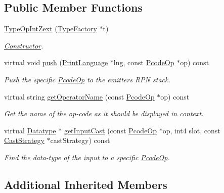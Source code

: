 \subsection*{Public Member Functions}
\begin{DoxyCompactItemize}
\item 
\mbox{\hyperlink{class_type_op_int_zext_aa97bd1e66c8746724b05c68a4ac2d7b2}{Type\+Op\+Int\+Zext}} (\mbox{\hyperlink{class_type_factory}{Type\+Factory}} $\ast$t)
\begin{DoxyCompactList}\small\item\em \mbox{\hyperlink{class_constructor}{Constructor}}. \end{DoxyCompactList}\item 
virtual void \mbox{\hyperlink{class_type_op_int_zext_a0b10f9f82e0b78957f8d83339c31626e}{push}} (\mbox{\hyperlink{class_print_language}{Print\+Language}} $\ast$lng, const \mbox{\hyperlink{class_pcode_op}{Pcode\+Op}} $\ast$op) const
\begin{DoxyCompactList}\small\item\em Push the specific \mbox{\hyperlink{class_pcode_op}{Pcode\+Op}} to the emitter\textquotesingle{}s R\+PN stack. \end{DoxyCompactList}\item 
virtual string \mbox{\hyperlink{class_type_op_int_zext_a4519823a40a0486592c35b2e4a4a3414}{get\+Operator\+Name}} (const \mbox{\hyperlink{class_pcode_op}{Pcode\+Op}} $\ast$op) const
\begin{DoxyCompactList}\small\item\em Get the name of the op-\/code as it should be displayed in context. \end{DoxyCompactList}\item 
virtual \mbox{\hyperlink{class_datatype}{Datatype}} $\ast$ \mbox{\hyperlink{class_type_op_int_zext_a2839a324572064596d01ea878f515f73}{get\+Input\+Cast}} (const \mbox{\hyperlink{class_pcode_op}{Pcode\+Op}} $\ast$op, int4 slot, const \mbox{\hyperlink{class_cast_strategy}{Cast\+Strategy}} $\ast$cast\+Strategy) const
\begin{DoxyCompactList}\small\item\em Find the data-\/type of the input to a specific \mbox{\hyperlink{class_pcode_op}{Pcode\+Op}}. \end{DoxyCompactList}\end{DoxyCompactItemize}
\subsection*{Additional Inherited Members}


